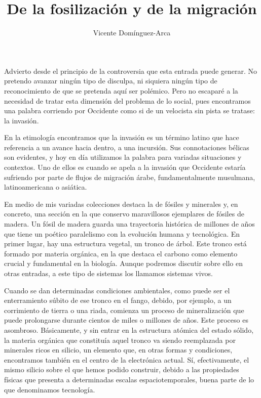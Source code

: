 \documentclass[12pt,a4paper]{article}
\title{De la fosilización y de la migración}
\author{Vicente Domínguez-Arca}
\date{}
\begin{document}
\maketitle

Advierto desde el principio de la controversia que esta entrada puede generar. No pretendo avanzar ningún tipo de disculpa, ni siquiera ningún tipo de reconocimiento de que se pretenda aquí ser polémico. Pero no escaparé a la necesidad de tratar esta dimensión del problema de lo social, pues encontramos una palabra corriendo por Occidente como si de un velocista sin pista se tratase: la invasión.

En la etimología encontramos que la invasión es un término latino que hace referencia a un avance hacia dentro, a una incursión. Sus connotaciones bélicas son evidentes, y hoy en día utilizamos la palabra para variadas situaciones y contextos. Uno de ellos es cuando se apela a la invasión que Occidente estaría sufriendo por parte de flujos de migración árabe, fundamentalmente musulmana, latinoamericana o asiática.

En medio de mis variadas colecciones destaca la de fósiles y minerales y, en concreto, una sección en la que conservo maravillosos ejemplares de fósiles de madera. Un fósil de madera guarda una trayectoria histórica de millones de años que tiene un poético paralelismo con la evolución humana y tecnológica. En primer lugar, hay una estructura vegetal, un tronco de árbol. Este tronco está formado por materia orgánica, en la que destaca el carbono como elemento crucial y fundamental en la biología. Aunque podremos discutir sobre ello en otras entradas, a este tipo de sistemas los llamamos sistemas vivos.

Cuando se dan determinadas condiciones ambientales, como puede ser el enterramiento súbito de ese tronco en el fango, debido, por ejemplo, a un corrimiento de tierra o una riada, comienza un proceso de mineralización que puede prolongarse durante cientos de miles o millones de años. Este proceso es asombroso. Básicamente, y sin entrar en la estructura atómica del estado sólido, la materia orgánica que constituía aquel tronco va siendo reemplazada por minerales ricos en silicio, un elemento que, en otras formas y condiciones, encontramos también en el centro de la electrónica actual. Sí, efectivamente, el mismo silicio sobre el que hemos podido construir, debido a las propiedades físicas que presenta a determinadas escalas espaciotemporales, buena parte de lo que denominamos tecnología.
\end{document}
